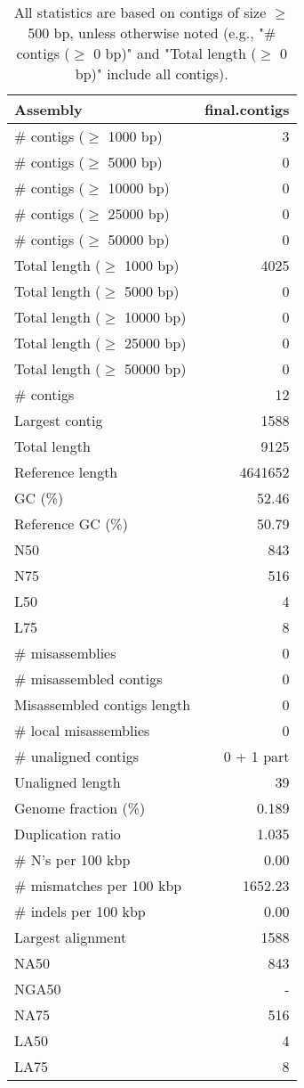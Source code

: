\documentclass[12pt,a4paper]{article}
\begin{document}
\begin{table}[ht]
\begin{center}
\caption{All statistics are based on contigs of size $\geq$ 500 bp, unless otherwise noted (e.g., "\# contigs ($\geq$ 0 bp)" and "Total length ($\geq$ 0 bp)" include all contigs).}
\begin{tabular}{|l*{1}{|r}|}
\hline
Assembly & final.contigs \\ \hline
\# contigs ($\geq$ 1000 bp) & 3 \\ \hline
\# contigs ($\geq$ 5000 bp) & 0 \\ \hline
\# contigs ($\geq$ 10000 bp) & 0 \\ \hline
\# contigs ($\geq$ 25000 bp) & 0 \\ \hline
\# contigs ($\geq$ 50000 bp) & 0 \\ \hline
Total length ($\geq$ 1000 bp) & 4025 \\ \hline
Total length ($\geq$ 5000 bp) & 0 \\ \hline
Total length ($\geq$ 10000 bp) & 0 \\ \hline
Total length ($\geq$ 25000 bp) & 0 \\ \hline
Total length ($\geq$ 50000 bp) & 0 \\ \hline
\# contigs & 12 \\ \hline
Largest contig & 1588 \\ \hline
Total length & 9125 \\ \hline
Reference length & 4641652 \\ \hline
GC (\%) & 52.46 \\ \hline
Reference GC (\%) & 50.79 \\ \hline
N50 & 843 \\ \hline
N75 & 516 \\ \hline
L50 & 4 \\ \hline
L75 & 8 \\ \hline
\# misassemblies & 0 \\ \hline
\# misassembled contigs & 0 \\ \hline
Misassembled contigs length & 0 \\ \hline
\# local misassemblies & 0 \\ \hline
\# unaligned contigs & 0 + 1 part \\ \hline
Unaligned length & 39 \\ \hline
Genome fraction (\%) & 0.189 \\ \hline
Duplication ratio & 1.035 \\ \hline
\# N's per 100 kbp & 0.00 \\ \hline
\# mismatches per 100 kbp & 1652.23 \\ \hline
\# indels per 100 kbp & 0.00 \\ \hline
Largest alignment & 1588 \\ \hline
NA50 & 843 \\ \hline
NGA50 & - \\ \hline
NA75 & 516 \\ \hline
LA50 & 4 \\ \hline
LA75 & 8 \\ \hline
\end{tabular}
\end{center}
\end{table}
\end{document}
